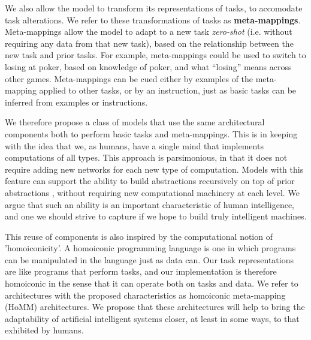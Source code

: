 We also allow the model to transform its representations of tasks, to accomodate task alterations. We refer to these transformations of tasks as \textbf{meta-mappings}. Meta-mappings allow the model to adapt to a new task \emph{zero-shot} (i.e. without requiring any data from that new task), based on the relationship between the new task and prior tasks. For example, meta-mappings could be used to switch to losing at poker, based on knowledge of poker, and what ``losing'' means across other games. Meta-mappings can be cued either by examples of the meta-mapping applied to other tasks, or by an instruction, just as basic tasks can be inferred from examples or instructions. 

We therefore propose a class of models that use the same architectural components both to perform basic tasks and meta-mappings.
This is in keeping with the idea that we, as humans, have a single mind that implements computations of all types. This approach is parsimonious, in that it does not require adding new networks for each new type of computation. Models with this feature can support the ability to build abstractions recursively on top of prior abstractions \citep{Wilensky1991, Hazzan1999, Lampinen2017b}, without requiring new computational machinery at each level. We argue that such an ability is an important characteristic of human intelligence, and one we should strive to capture if we hope to build truly intelligent machines.

This reuse of components is also inspired by the computational notion of 'homoiconicity'. A homoiconic programming  language is one in which programs can be manipulated in  the language just as data can. Our task representations are like programs that perform tasks, and our implementation is therefore homoiconic in the sense that it can operate both on tasks and data. We refer to architectures with the proposed characteristics as homoiconic meta-mapping (HoMM) architectures. We propose that these architectures will help to bring the adaptability of artificial intelligent systems closer, at least in some ways, to that exhibited by humans.

